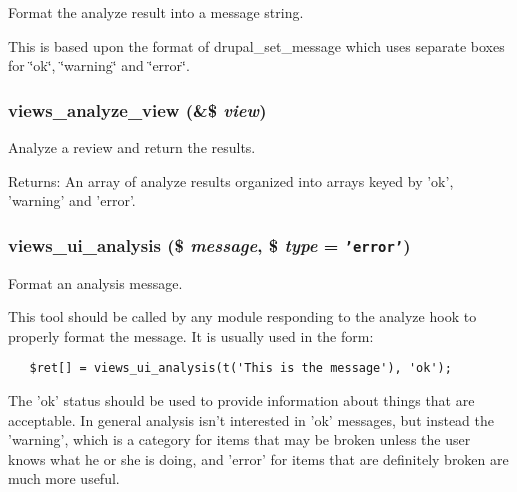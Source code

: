 Format the analyze result into a message string.

This is based upon the format of drupal\_\-set\_\-message which uses separate boxes for \char`\"{}ok\char`\"{}, \char`\"{}warning\char`\"{} and \char`\"{}error\char`\"{}. \hypertarget{analyze_8inc_8f418e18d26fe543f6e960bade40a367}{
\subsubsection[{views\_\-analyze\_\-view}]{\setlength{\rightskip}{0pt plus 5cm}views\_\-analyze\_\-view (\&\$ {\em view})}}
\label{analyze_8inc_8f418e18d26fe543f6e960bade40a367}


Analyze a review and return the results.

\begin{Desc}
\item[Returns:]An array of analyze results organized into arrays keyed by 'ok', 'warning' and 'error'. \end{Desc}
\hypertarget{analyze_8inc_a4f08098638b001519a0f905b102f22a}{
\subsubsection[{views\_\-ui\_\-analysis}]{\setlength{\rightskip}{0pt plus 5cm}views\_\-ui\_\-analysis (\$ {\em message}, \/  \$ {\em type} = {\tt 'error'})}}
\label{analyze_8inc_a4f08098638b001519a0f905b102f22a}


Format an analysis message.

This tool should be called by any module responding to the analyze hook to properly format the message. It is usually used in the form: 

\begin{Code}\begin{verbatim}   $ret[] = views_ui_analysis(t('This is the message'), 'ok');
\end{verbatim}
\end{Code}



The 'ok' status should be used to provide information about things that are acceptable. In general analysis isn't interested in 'ok' messages, but instead the 'warning', which is a category for items that may be broken unless the user knows what he or she is doing, and 'error' for items that are definitely broken are much more useful.

